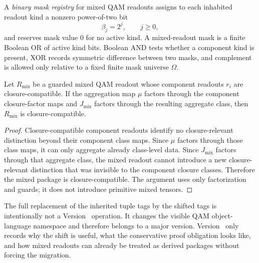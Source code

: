 \begin{definition}\label{def:binary-mask-registry-mixed-readouts}
A \emph{binary mask registry} for mixed QAM readouts assigns to each inhabited readout kind a nonzero power-of-two bit
\[
  \beta_j = 2^j,
  \qquad j\ge 0,
\]
and reserves mask value 0 for no active kind. A mixed-readout mask is a finite Boolean OR of active kind bits. Boolean AND tests whether a component kind is present, XOR records symmetric difference between two masks, and complement is allowed only relative to a fixed finite mask universe $\Omega$.
\end{definition}

\begin{proposition}\label{prop:mixed-readout-factorization}
Let $R_{\mathrm{mix}}$ be a guarded mixed QAM readout whose component readouts $r_i$ are closure-compatible. If the aggregation map $\mu$ factors through the component closure-factor maps and $J_{\mathrm{mix}}$ factors through the resulting aggregate class, then $R_{\mathrm{mix}}$ is closure-compatible.
\end{proposition}

\begin{proof}
Closure-compatible component readouts identify no closure-relevant distinction beyond their component class maps. Since $\mu$ factors through those class maps, it can only aggregate already class-level data. Since $J_{\mathrm{mix}}$ factors through that aggregate class, the mixed readout cannot introduce a new closure-relevant distinction that was invisible to the component closure classes. Therefore the mixed package is closure-compatible. The argument uses only factorization and guards; it does not introduce primitive mixed tensors.
\end{proof}

\begin{remark}\label{rem:v4-qam-migration-trigger}
The full replacement of the inherited tuple tags by the shifted tags is intentionally not a Version~\docversion{} operation. It changes the visible QAM object-language namespace and therefore belongs to a major version. Version~\docversion{} only records why the shift is useful, what the conservative proof obligation looks like, and how mixed readouts can already be treated as derived packages without forcing the migration.
\end{remark}


%
%

